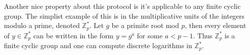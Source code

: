Another nice property about this protocol is it's applicable to any finite cyclic group. The simplist example of this is in the multiplicative units of the integers modulo a prime, denoted $\mathbb{Z}_p^*$. Let $g$ be a primite root mod $p$, then every element of $y \in \mathbb{Z}_p^*$ can be written in the form $y = g^a$ for some $a < p-1$. Thus $\mathbb{Z}_p^*$ is a finite cyclic group and one can compute discrete logarithms in $\mathbb{Z}_p^*$.





